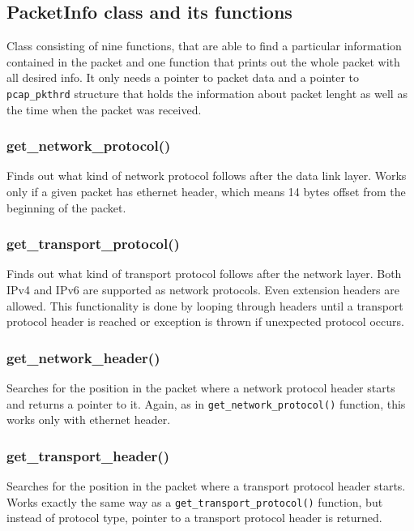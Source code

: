 \documentclass[a4paper,12pt]{article}
\begin{document}
    \subsection{PacketInfo class and its functions}
        Class consisting of nine functions, that are able to find a particular information contained in the packet and one function that prints out the whole packet with all desired info. It only needs a pointer to packet data and a pointer to \texttt{pcap\_pkthrd} structure that holds the information about packet lenght as well as the time when the packet was received.
        \subsubsection{get\_network\_protocol()}
        Finds out what kind of network protocol follows after the data link layer. Works only if a given packet has ethernet header, which means 14 bytes offset from the beginning of the packet. 
        
        \subsubsection{get\_transport\_protocol()}
        Finds out what kind of transport protocol follows after the network layer. Both IPv4 and IPv6 are supported as network protocols. Even extension headers are allowed. This functionality is done by looping through headers until a transport protocol header is reached or exception is thrown if unexpected protocol occurs. 
        
        \subsubsection{get\_network\_header()}
        Searches for the position in the packet where a network protocol header starts and returns a pointer to it. Again, as in \texttt{get\_network\_protocol()} function, this works only with ethernet header.
        
        \subsubsection{get\_transport\_header()}
        Searches for the position in the packet where a transport protocol header starts. Works exactly the same way as a \texttt{get\_transport\_protocol()} function, but instead of protocol type, pointer to a transport protocol header is returned.
        
\end{document}
